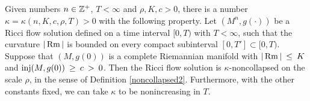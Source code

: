 \begin{theorem}
  \label{thm:kl-no-local-collapsing-theorem-ii-existence-kappa-solutions}
 \label{nolocalcollapse}
Given numbers $n \in {\mathbb Z}^+$,  $T < \infty$
and $\rho, K, c > 0$, there is a number $\kappa = \kappa(n,K,c,\rho, T)>0$
with the following property.
Let $(M^n, g(\cdot))$ be a Ricci flow solution
defined on a
time interval $[0, T)$ with $T < \infty$, such that the curvature $|\operatorname{Rm}|$
is bounded on every compact subinterval $[0,T']\subset [0,T)$.
Suppose that $(M, g(0))$ is a complete
Riemannian manifold with $|\operatorname{Rm}| \: \le \: K$ and
$\operatorname{inj}(M, g(0)) \: \ge \: c \: > \: 0$. Then
the Ricci flow solution is $\kappa$-noncollapsed on the scale $\rho$,
in the sense of Definition \ref{noncollapsed2}.
Furthermore, with the other constants fixed, we can take
$\kappa$ to be nonincreasing in $T$.
\end{theorem}
